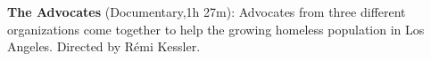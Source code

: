 \textbf{The Advocates} (Documentary,1h 27m): Advocates from three different organizations come together to help the growing homeless population in Los Angeles. Directed by R\'emi Kessler.